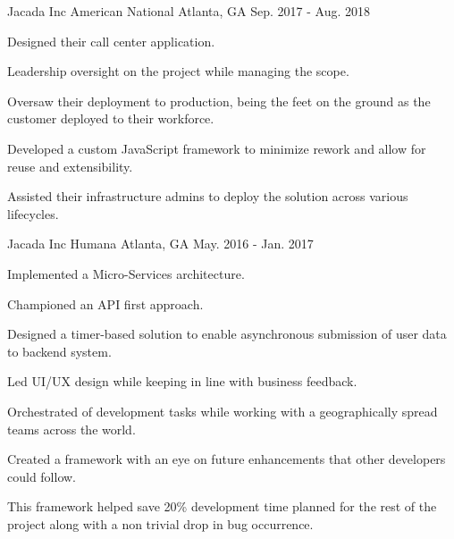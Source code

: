 \begin{cventries}
\cventry
{Jacada Inc} %
{American National} %
{Atlanta, GA} %
{Sep. 2017 - Aug. 2018} %
{
  \begin{cvitems} %
    \item {Designed their call center application.}
    \item {Leadership oversight on the project while managing the scope.}
    \item {Oversaw their deployment to production, being the feet on the ground as the customer deployed to their workforce.}
    \item {Developed a custom JavaScript framework to minimize rework and allow for reuse and extensibility.}
    \item {Assisted their infrastructure admins to deploy the solution across various lifecycles.}
  \end{cvitems}
}

\cventry
{Jacada Inc} %
{Humana} %
{Atlanta, GA} %
{May. 2016 - Jan. 2017} %
{
  \begin{cvitems} %
    \item {Implemented a Micro-Services architecture.}
    \item {Championed an API first approach.}
    \item {Designed a timer-based solution to enable asynchronous submission of user data to backend system.}
    \item {Led UI/UX design while keeping in line with business feedback.}
    \item {Orchestrated of development tasks while working with a geographically spread teams across the world.}
    \item {Created a framework with an eye on future enhancements that other developers could follow.}
    \item {This framework helped save 20\% development time planned for the rest of the project along with a non trivial drop in bug occurrence.}
  \end{cvitems}
}

\end{cventries}
